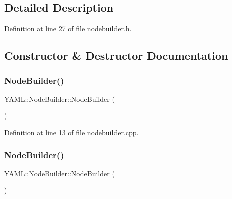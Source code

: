 \subsection{Detailed Description}


Definition at line 27 of file nodebuilder.\+h.



\subsection{Constructor \& Destructor Documentation}
\mbox{\label{class_y_a_m_l_1_1_node_builder_aa49e445eb75f93a714e6cb5682313daa}} 
\subsubsection{\texorpdfstring{NodeBuilder()}{NodeBuilder()}\hspace{0.1cm}{\footnotesize\ttfamily [1/3]}}
{\footnotesize\ttfamily Y\+A\+M\+L\+::\+Node\+Builder\+::\+Node\+Builder (\begin{DoxyParamCaption}{ }\end{DoxyParamCaption})}



Definition at line 13 of file nodebuilder.\+cpp.

\mbox{\label{class_y_a_m_l_1_1_node_builder_a6d70411ab26f00493619515f54157dd2}} 
\subsubsection{\texorpdfstring{NodeBuilder()}{NodeBuilder()}\hspace{0.1cm}{\footnotesize\ttfamily [2/3]}}
{\footnotesize\ttfamily Y\+A\+M\+L\+::\+Node\+Builder\+::\+Node\+Builder (\begin{DoxyParamCaption}\item[{const \mbox{\hyperlink{class_y_a_m_l_1_1_node_builder}{Node\+Builder}} \&}]{ }\end{DoxyParamCaption})\hspace{0.3cm}{\ttfamily [delete]}}

